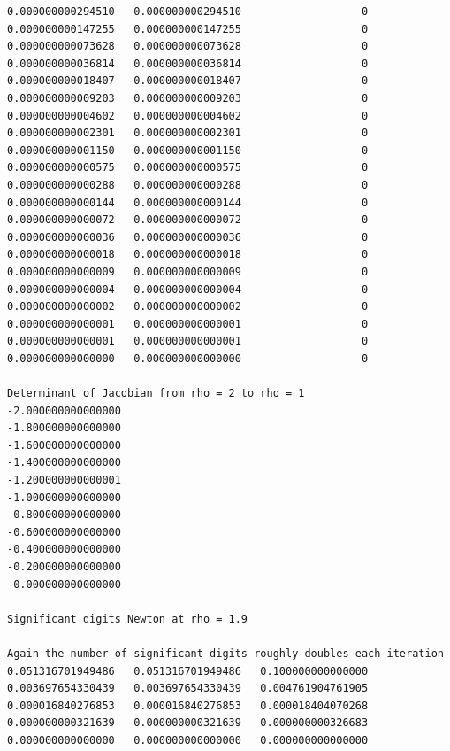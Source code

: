 \documentclass[11pt]{amsart}
\begin{document}
\begin{lstlisting}
0.000000000294510   0.000000000294510                   0
0.000000000147255   0.000000000147255                   0
0.000000000073628   0.000000000073628                   0
0.000000000036814   0.000000000036814                   0
0.000000000018407   0.000000000018407                   0
0.000000000009203   0.000000000009203                   0
0.000000000004602   0.000000000004602                   0
0.000000000002301   0.000000000002301                   0
0.000000000001150   0.000000000001150                   0
0.000000000000575   0.000000000000575                   0
0.000000000000288   0.000000000000288                   0
0.000000000000144   0.000000000000144                   0
0.000000000000072   0.000000000000072                   0
0.000000000000036   0.000000000000036                   0
0.000000000000018   0.000000000000018                   0
0.000000000000009   0.000000000000009                   0
0.000000000000004   0.000000000000004                   0
0.000000000000002   0.000000000000002                   0
0.000000000000001   0.000000000000001                   0
0.000000000000001   0.000000000000001                   0
0.000000000000000   0.000000000000000                   0

Determinant of Jacobian from rho = 2 to rho = 1
-2.000000000000000
-1.800000000000000
-1.600000000000000
-1.400000000000000
-1.200000000000001
-1.000000000000000
-0.800000000000000
-0.600000000000000
-0.400000000000000
-0.200000000000000
-0.000000000000000

Significant digits Newton at rho = 1.9

Again the number of significant digits roughly doubles each iteration
0.051316701949486   0.051316701949486   0.100000000000000
0.003697654330439   0.003697654330439   0.004761904761905
0.000016840276853   0.000016840276853   0.000018404070268
0.000000000321639   0.000000000321639   0.000000000326683
0.000000000000000   0.000000000000000   0.000000000000000


\end{lstlisting}
\end{document}
